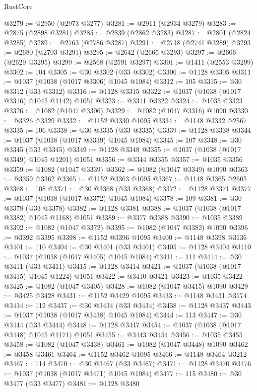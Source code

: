 \begin{lexlean}{RustCore}
\begin{coremodule}
@3279 := @2950 (@2973 @3277)
@3281 := @2911 (@2934 @3279)
@3283 := @2875 (@2898 @3281)
@3285 := @2839 (@2862 @3283)
@3287 := @2801 (@2824 @3285)
@3289 := @2763 (@2786 @3287)
@3291 := @2718 (@2741 @3289)
@3293 := @2680 (@2703 @3291)
@3295 := @2642 (@2665 @3293)
@3297 := @2606 (@2629 @3295)
@3299 := @2568 (@2591 @3297)
@3301 := @1411 (@2553 @3299)
@3302 := 104
@3305 := @30 @3302 (@33 @3302)
@3306 := @1128 @3305
@3311 := @1037 (@1038 (@1017 @3306) @1045 @1084)
@3312 := 105
@3315 := @30 @3312 (@33 @3312)
@3316 := @1128 @3315
@3322 := @1037 (@1038 (@1017 @3316) @1045 @1142) @1051
@3323 := @3311 @3322
@3324 := @1035 @3323
@3326 := @1082 (@1047 @3306)
@3329 := @1082 (@1047 @3316) @1090
@3330 := @3326 @3329
@3332 := @1152 @3330 @1095
@3334 := @1148 @3332 @2567
@3335 := 106
@3338 := @30 @3335 (@33 @3335)
@3339 := @1128 @3338
@3344 := @1037 (@1038 (@1017 @3339) @1045 @1084)
@3345 := 107
@3348 := @30 @3345 (@33 @3345)
@3349 := @1128 @3348
@3355 := @1037 (@1038 (@1017 @3349) @1045 @1201) @1051
@3356 := @3344 @3355
@3357 := @1035 @3356
@3359 := @1082 (@1047 @3339)
@3362 := @1082 (@1047 @3349) @1090
@3363 := @3359 @3362
@3365 := @1152 @3363 @1095
@3367 := @1148 @3365 @2605
@3368 := 108
@3371 := @30 @3368 (@33 @3368)
@3372 := @1128 @3371
@3377 := @1037 (@1038 (@1017 @3372) @1045 @1084)
@3378 := 109
@3381 := @30 @3378 (@33 @3378)
@3382 := @1128 @3381
@3388 := @1037 (@1038 (@1017 @3382) @1045 @1168) @1051
@3389 := @3377 @3388
@3390 := @1035 @3389
@3392 := @1082 (@1047 @3372)
@3395 := @1082 (@1047 @3382) @1090
@3396 := @3392 @3395
@3398 := @1152 @3396 @1095
@3400 := @1148 @3398 @3136
@3401 := 110
@3404 := @30 @3401 (@33 @3401)
@3405 := @1128 @3404
@3410 := @1037 (@1038 (@1017 @3405) @1045 @1084)
@3411 := 111
@3414 := @30 @3411 (@33 @3411)
@3415 := @1128 @3414
@3421 := @1037 (@1038 (@1017 @3415) @1045 @1224) @1051
@3422 := @3410 @3421
@3423 := @1035 @3422
@3425 := @1082 (@1047 @3405)
@3428 := @1082 (@1047 @3415) @1090
@3429 := @3425 @3428
@3431 := @1152 @3429 @1095
@3433 := @1148 @3431 @3174
@3434 := 112
@3437 := @30 @3434 (@33 @3434)
@3438 := @1128 @3437
@3443 := @1037 (@1038 (@1017 @3438) @1045 @1084)
@3444 := 113
@3447 := @30 @3444 (@33 @3444)
@3448 := @1128 @3447
@3454 := @1037 (@1038 (@1017 @3448) @1045 @1171) @1051
@3455 := @3443 @3454
@3456 := @1035 @3455
@3458 := @1082 (@1047 @3438)
@3461 := @1082 (@1047 @3448) @1090
@3462 := @3458 @3461
@3464 := @1152 @3462 @1095
@3466 := @1148 @3464 @3212
@3467 := 114
@3470 := @30 @3467 (@33 @3467)
@3471 := @1128 @3470
@3476 := @1037 (@1038 (@1017 @3471) @1045 @1084)
@3477 := 115
@3480 := @30 @3477 (@33 @3477)
@3481 := @1128 @3480

\end{coremodule}
\end{lexlean}
